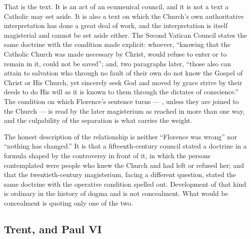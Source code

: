 That is the text. It is an act of an ecumenical council, and it is not a text a Catholic may set aside. It is also a text on which the Church's own authoritative interpretation has done a great deal of work, and the interpretation is itself magisterial and cannot be set aside either. The Second Vatican Council states the same doctrine with the condition made explicit: whoever, ``knowing that the Catholic Church was made necessary by Christ, would refuse to enter or to remain in it, could not be saved''; and, two paragraphs later, ``those also can attain to salvation who through no fault of their own do not know the Gospel of Christ or His Church, yet sincerely seek God and moved by grace strive by their deeds to do His will as it is known to them through the dictates of conscience.'' The condition on which Florence's sentence turns --- , unless they are joined to the Church --- is read by the later magisterium as reached in more than one way, and the culpability of the separation is what carries the weight.

The honest description of the relationship is neither ``Florence was wrong'' nor ``nothing has changed.'' It is that a fifteenth-century council stated a doctrine in a formula shaped by the controversy in front of it, in which the persons contemplated were people who knew the Church and had left or refused her; and that the twentieth-century magisterium, facing a different question, stated the same doctrine with the operative condition spelled out. Development of that kind is ordinary in the history of dogma and is not concealment. What would be concealment is quoting only one of the two.

\subsection{Trent, and Paul VI}

